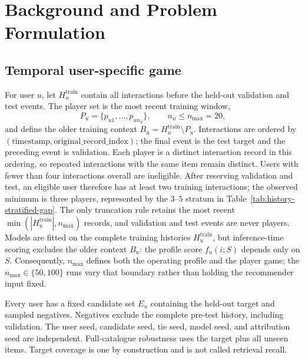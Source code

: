 \documentclass[manuscript,screen,review,anonymous]{acmart}
\begin{document}
\section{Background and Problem Formulation}
\subsection{Temporal user-specific game}
For user $u$, let $H_u^{\mathrm{train}}$ contain all interactions before the held-out validation and test events. The player set is the most recent training window,
\begin{equation}
P_u=\{p_{u1},\ldots,p_{un_u}\},\qquad n_u\le n_{\max}=20,
\end{equation}
and define the older training context $B_u=H_u^{\mathrm{train}}\setminus P_u$. Interactions are ordered by $(\mathrm{timestamp},\mathrm{original\_record\_index})$; the final event is the test target and the preceding event is validation. Each player is a distinct interaction record in this ordering, so repeated interactions with the same item remain distinct. Users with fewer than four interactions overall are ineligible. After reserving validation and test, an eligible user therefore has at least two training interactions; the observed minimum is three players, represented by the $3$--$5$ stratum in Table~\ref{tab:history-stratified-gap}. The only truncation rule retains the most recent $\min(|H_u^{\mathrm{train}}|,n_{\max})$ records, and validation and test events are never players. Models are fitted on the complete training histories $H_u^{\mathrm{train}}$, but inference-time scoring excludes the older context $B_u$: the profile score $f_u(i;S)$ depends only on $S$. Consequently, $n_{\max}$ defines both the operating profile and the player game; the $n_{\max}\in\{50,100\}$ runs vary that boundary rather than holding the recommender input fixed.

Every user has a fixed candidate set $E_u$ containing the held-out target and sampled negatives. Negatives exclude the complete pre-test history, including validation. The user seed, candidate seed, tie seed, model seed, and attribution seed are independent. Full-catalogue robustness uses the target plus all unseen items. Target coverage is one by construction and is not called retrieval recall.
\end{document}
